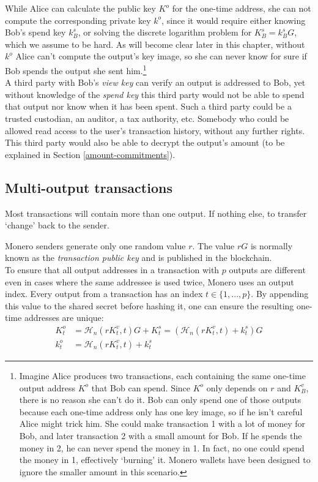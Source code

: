 While Alice can calculate the public key $K^o$ for the one-time address, she can not compute the corresponding private key $k^o$, since it would require either knowing Bob’s spend key $k_B^s$, or solving the discrete logarithm problem for $K_B^s = k_B^s G$, which we assume to be hard. As will become clear later in this chapter, without $k^o$ Alice can't compute the output's key image, so she can never know for sure if Bob spends the output she sent him.\footnote{Imagine Alice produces two transactions, each containing the same one-time output address $K^o$ that Bob can spend. Since $K^o$ only depends on $r$ and $K_B^v$, there is no reason she can't do it. Bob can only spend one of those outputs because each one-time address only has one key image, so if he isn't careful Alice might trick him. She could make transaction 1 with a lot of money for Bob, and later transaction 2 with a small amount for Bob. If he spends the money in 2, he can never spend the money in 1. In fact, no one could spend the money in 1, effectively `burning' it. Monero wallets have been designed to ignore the smaller amount in this scenario.}
\\

A third party with Bob’s {\em view key} can verify an output is addressed to Bob, yet without knowledge of the {\em spend key} this third party would not be able to spend that output nor know when it has been spent. Such a third party could be a trusted custodian, an auditor, a tax authority, etc. Somebody who could be allowed read access to the user’s transaction history, without any further rights. This third party would also be able to decrypt the output's amount (to be explained in Section \ref{amount-commitments}).


\subsection{Multi-output transactions}
\label{sec:multi_out_transactions}

Most transactions will contain more than one output. If nothing else, to transfer `change’ back to the sender.

Monero senders generate only one random value $r$. The value $r G$ is normally known as the {\em transaction public key} and is published in the blockchain.\\

To ensure that all output addresses in a transaction with $p$ outputs are different even in cases where the same addressee is used twice, Monero uses an output index. Every output from a transaction has an index $t \in \{1, ..., p\}$. By appending this value to the shared secret before hashing it, one can ensure the resulting one-time addresses are unique:\\
\begin{align*}
  K_t^o &= \mathcal{H}_n(r K_t^v, t)G + K_t^s = (\mathcal{H}_n(r K_t^v, t) + k_t^s)G  \\ 
  k_t^o &= \mathcal{H}_n(r K_t^v, t) + k_t^s
\end{align*} 

